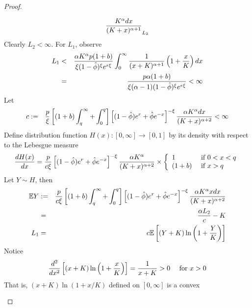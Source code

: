 \documentclass{article}
\newcommand{\E}{
  \mathbb{E}
}
\newcommand{\1}[1]{
  \mathbf{1}_{\{#1\}}
}
\begin{document}
\begin{proof}
\begin{enumerate}[i.]
\begin{eqnarray*}
{        {K^{\alpha} dx \over (K + x)^{\alpha + 1} }
      }_{L_2}
    \end{eqnarray*}
    Clearly $L_2 < \infty$. For $L_1$, observe
    \begin{eqnarray*}
      L_1 &<& {
        \alpha K^\alpha p (1 + b)
        \over
        \xi (1 - \hat\phi)^\xi e^{r \xi}
      } \int_0^\infty
      {1 \over (x + K)^{\alpha + 1}}
      \left(1 + {x \over K}\right)
      dx \\
      &=&
      {
        p \alpha (1 + b)
        \over
        \xi (\alpha - 1) (1 - \hat\phi)^\xi e^{r \xi}
      } < \infty
    \end{eqnarray*}
    Let
    \begin{eqnarray*}
      c &:=& {p \over \xi}
      \left[
        (1 + b)\int_{q}^{\infty} +
        \int_{0}^q
      \right]
      \left[
        (1 - \hat\phi) e^r + \hat\phi e^{-x}
      \right]^{-\xi}
      {
        \alpha K^{\alpha} dx \over (K + x)^{\alpha + 2}
      } < \infty
    \end{eqnarray*}
    Define distribution function $H(x): [0, \infty] \to [0, 1]$ by its
    density with respect to the Lebesgue measure
    \[
    {d H(x) \over d x}
    =
    {p \over c \xi}
    \left[
      (1 - \hat\phi) e^r + \hat\phi e^{-x}
    \right]^{-\xi}
    {
      \alpha K^{\alpha}
      \over
      (K + x)^{\alpha + 2}
    }
    \times
    \left\{
      \begin{array}{ll}
        1 & \text{ if } 0 < x < q \\
        (1 + b) & \text{ if } x > q \\
      \end{array}
    \right.
    \]
    Let $Y \sim H$, then
    \begin{eqnarray*}
      \E Y &:=& {p \over c \xi}
      \left[
        (1 + b)\int_{q}^{\infty} +
        \int_{0}^q
      \right]
      \left[
        (1 - \hat\phi) e^r + \hat\phi e^{-x}
      \right]^{-\xi} {
        \alpha K^{\alpha} x dx
        \over
        (K + x)^{\alpha + 2}
      } \\
      &=& {\alpha L_2 \over c} - K \\
      L_1 &=& c \E \left[
        (Y + K) \ln \left(1 + {Y \over K} \right)
      \right]
    \end{eqnarray*}
    Notice
    \[
    {
      d^2
      \over
      dx^2
    }
    \left[
      (x + K) \ln\left(1 + {x \over K}\right)
    \right] = {1 \over x + K} > 0
    \quad \text{ for } x > 0
    \]
    That is, $(x + K) \ln(1 + x/K)$ defined on $[0, \infty]$ is a convex

\end{enumerate}
\end{proof}
\end{document}
